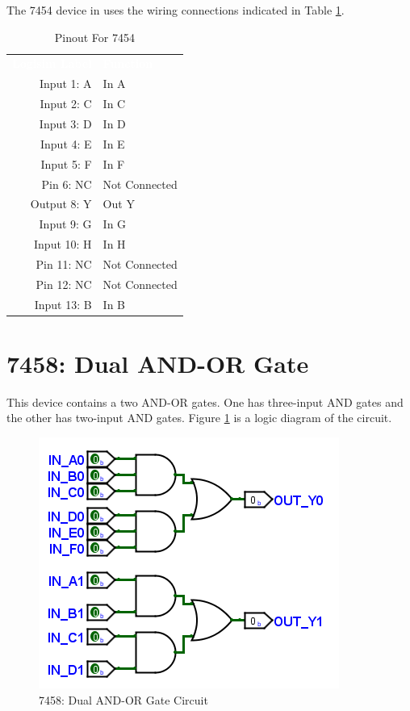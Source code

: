 The 7454 device in \LE uses the wiring connections indicated in Table \ref{tab:50-7454}.

\begin{table}[H]
	\sffamily
	\newcommand{\head}[1]{\textcolor{white}{\textbf{#1}}}		
	\begin{center}
		\begin{tabular}{rl} 
			\rowcolor{black!75}
			\head{Logisim Label} & \head{Function} \\
			Input 1: A   & In A          \\
			Input 2: C   & In C          \\
			Input 3: D   & In D          \\
			Input 4: E   & In E          \\
			Input 5: F   & In F          \\
			Pin 6: NC    & Not Connected \\
			Output 8: Y  & Out Y         \\
			Input 9: G   & In G          \\
			Input 10: H  & In H          \\
			Pin 11: NC   & Not Connected \\
			Pin 12: NC   & Not Connected \\
			Input 13: B  & In B          \\
		\end{tabular}
	\end{center}
	\caption{Pinout For 7454}
	\label{tab:50-7454}
\end{table}

\section{7458: Dual AND-OR Gate}

This device contains a two AND-OR gates. One has three-input AND gates and the other has two-input AND gates. Figure \ref{fig:50-7458} is a logic diagram of the circuit.

\begin{figure}[H]
	\centering
	\includegraphics{gfx/50-7458}
	\caption{7458: Dual AND-OR Gate Circuit}
	\label{fig:50-7458}
\end{figure}

